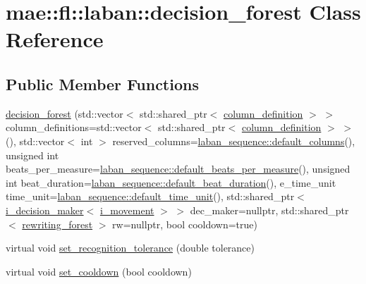 \hypertarget{classmae_1_1fl_1_1laban_1_1decision__forest}{\section{mae\-:\-:fl\-:\-:laban\-:\-:decision\-\_\-forest Class Reference}
\label{classmae_1_1fl_1_1laban_1_1decision__forest}
}
\subsection*{Public Member Functions}
\begin{DoxyCompactItemize}
\item 
\hyperlink{classmae_1_1fl_1_1laban_1_1decision__forest_ac3373a7eb4c88665e58f83cdccbf6512}{decision\-\_\-forest} (std\-::vector$<$ std\-::shared\-\_\-ptr$<$ \hyperlink{classmae_1_1fl_1_1laban_1_1column__definition}{column\-\_\-definition} $>$ $>$ column\-\_\-definitions=std\-::vector$<$ std\-::shared\-\_\-ptr$<$ \hyperlink{classmae_1_1fl_1_1laban_1_1column__definition}{column\-\_\-definition} $>$ $>$(), std\-::vector$<$ int $>$ reserved\-\_\-columns=\hyperlink{classmae_1_1fl_1_1laban_1_1laban__sequence_adda43b657712484d90b4ef3927a81128}{laban\-\_\-sequence\-::default\-\_\-columns}(), unsigned int beats\-\_\-per\-\_\-measure=\hyperlink{classmae_1_1fl_1_1laban_1_1laban__sequence_a2e64362d5cfeb89eb8545cb064e63170}{laban\-\_\-sequence\-::default\-\_\-beats\-\_\-per\-\_\-measure}(), unsigned int beat\-\_\-duration=\hyperlink{classmae_1_1fl_1_1laban_1_1laban__sequence_ac7bf04cdac0c3aed6b8ee4a887e561d9}{laban\-\_\-sequence\-::default\-\_\-beat\-\_\-duration}(), e\-\_\-time\-\_\-unit time\-\_\-unit=\hyperlink{classmae_1_1fl_1_1laban_1_1laban__sequence_ada28215d43d85e983fe6129e9816eed2}{laban\-\_\-sequence\-::default\-\_\-time\-\_\-unit}(), std\-::shared\-\_\-ptr$<$ \hyperlink{classmae_1_1fl_1_1laban_1_1i__decision__maker}{i\-\_\-decision\-\_\-maker}$<$ \hyperlink{classmae_1_1fl_1_1laban_1_1i__movement}{i\-\_\-movement} $>$ $>$ dec\-\_\-maker=nullptr, std\-::shared\-\_\-ptr$<$ \hyperlink{classmae_1_1fl_1_1laban_1_1rewriting__forest}{rewriting\-\_\-forest} $>$ rw=nullptr, bool cooldown=true)
\item 
virtual void \hyperlink{classmae_1_1fl_1_1laban_1_1decision__forest_a7308f844dea15ccb31b7c85529388c04}{set\-\_\-recognition\-\_\-tolerance} (double tolerance)
\item 
virtual void \hyperlink{classmae_1_1fl_1_1laban_1_1decision__forest_a6402e3689c1af77d01e88dd08901abe2}{set\-\_\-cooldown} (bool cooldown)

\end{DoxyCompactItemize}

